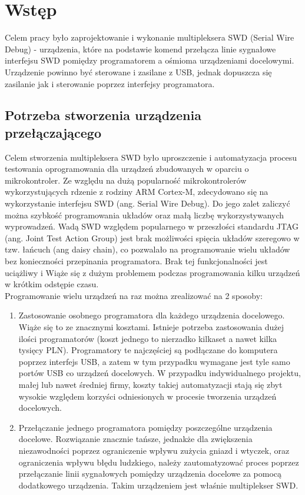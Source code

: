 \chapter{Wstęp}
Celem pracy było zaprojektowanie i wykonanie multipleksera SWD (Serial Wire Debug) - urządzenia, które na podstawie komend przełącza linie sygnałowe interfejsu SWD pomiędzy programatorem a ośmioma urządzeniami docelowymi. Urządzenie powinno być sterowane i zasilane z USB, jednak dopuszcza się zasilanie jak i sterowanie poprzez interfejsy programatora.

\section{Potrzeba stworzenia urządzenia przełączającego}
Celem stworzenia multipleksera SWD było uproszczenie i automatyzacja procesu testowania oprogramowania dla urządzeń zbudowanych w oparciu o mikrokontroler. Ze względu na dużą popularność mikrokontrolerów wykorzystujących rdzenie z rodziny ARM Cortex-M, zdecydowano się na wykorzystanie interfejsu SWD (ang. Serial Wire Debug). Do jego zalet zaliczyć można szybkość programowania układów oraz małą liczbę wykorzystywanych wyprowadzeń. Wadą SWD względem popularnego w przeszłości standardu JTAG (ang. Joint Test Action Group) jest brak możliwości spięcia układów szeregowo w tzw. łańcuch (ang daisy chain), co pozwalało na programowanie wielu układów bez konieczności przepinania programatora. Brak tej funkcjonalności jest uciążliwy i Wiąże się z dużym problemem podczas programowania kilku urządzeń w krótkim odstępie czasu. \\
Programowanie wielu urządzeń na raz można zrealizować na 2 sposoby:
\begin{enumerate}
    \item Zastosowanie osobnego programatora dla każdego urządzenia docelowego. Wiąże się to ze znacznymi kosztami. Istnieje potrzeba zastosowania dużej ilości programatorów  (koszt jednego to nierzadko kilkaset a nawet kilka tysięcy PLN). Programatory te najczęściej są podłączane do komputera poprzez interfejs USB, a zatem w tym przypadku wymagane jest tyle samo portów USB co urządzeń docelowych. W przypadku indywidualnego projektu, małej lub nawet średniej firmy, koszty takiej automatyzacji stają się zbyt wysokie względem korzyści odniesionych w procesie tworzenia urządzeń docelowych.
    \item Przełączanie jednego programatora pomiędzy poszczególne urządzenia docelowe. Rozwiązanie znacznie tańsze, jednakże dla zwiększenia niezawodności poprzez ograniczenie wpływu zużycia gniazd i wtyczek, oraz ograniczenia wpływu błędu ludzkiego, należy zautomatyzować proces poprzez przełączanie linii sygnałowych pomiędzy urządzenia docelowe za pomocą dodatkowego urządzenia. Takim urządzeniem jest właśnie multiplekser SWD.
\end{enumerate}

